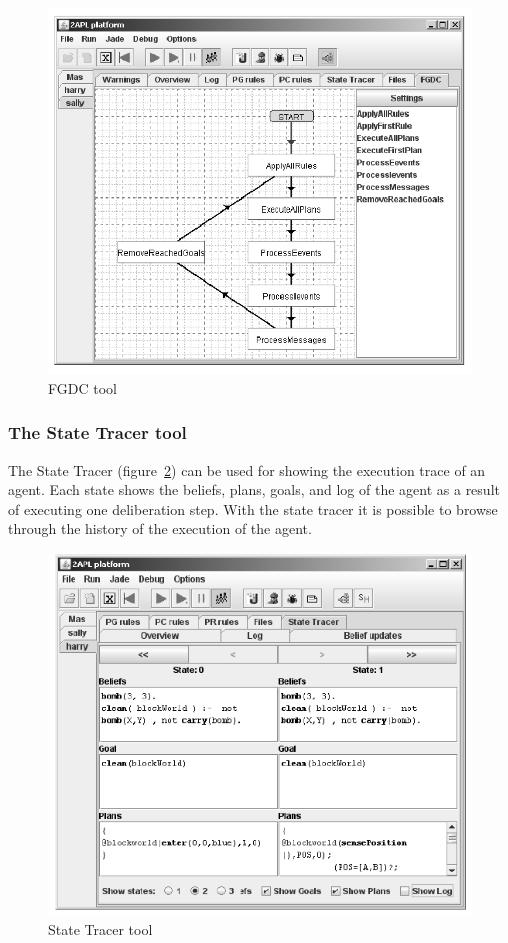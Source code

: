\documentclass[a4paper]{article}
\begin{document}
\begin{figure}[htp]
\centering
\includegraphics[keepaspectratio,scale=0.6]{fig/fgdc.png}
\caption{FGDC tool}
\label{fig:fgdc}
\end{figure}

\subsubsection{The State Tracer tool}

The State Tracer (figure~\ref{fig:state}) can be used for showing the execution trace of an agent. Each state shows the beliefs, plans, goals, and log of the agent as a result of executing one deliberation step. With the state tracer it is possible to browse through the history of the execution of the agent.

\begin{figure}[htp]
\centering
\includegraphics[keepaspectratio,scale=0.7]{fig/state.png}
\caption{State Tracer tool}
\label{fig:state}
\end{figure}
\end{document}
